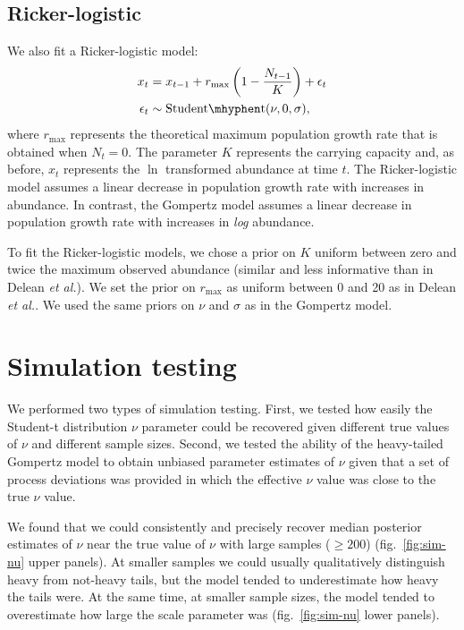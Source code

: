 \documentclass[12pt]{article}
\begin{document}
\subsection{Ricker-logistic} We also fit a Ricker-logistic model:
\begin{align}
x_t &= x_{t-1} + r_{\mathrm{max}}\left(1 - \frac{N_{t-1}}{K}\right) + \epsilon_t\\
\epsilon_t &\sim \mathrm{Student\mhyphen t}(\nu, 0, \sigma),
\end{align}
where \(r_\mathrm{max}\) represents the theoretical maximum population growth rate that is obtained when \(N_t = 0\). The parameter \(K\) represents the carrying capacity and, as before, \(x_t\) represents the \(\ln\) transformed abundance at time \(t\). The Ricker-logistic model assumes a linear decrease in population growth rate with increases in abundance. In contrast, the Gompertz model assumes a linear decrease in population growth rate with increases in \textit{log} abundance.

To fit the Ricker-logistic models, we chose a prior on \(K\) uniform between zero and twice the maximum observed abundance (similar and less informative than in Delean \emph{et al.}\cite{delean2013}). We set the prior on \(r_\mathrm{max}\) as uniform between 0 and 20 as in Delean \emph{et al.}\cite{delean2013}. We used the same priors on \(\nu\) and \(\sigma\) as in the Gompertz model.

\section{Simulation testing} We performed two types of simulation testing. First, we tested how easily the Student-t distribution \(\nu\) parameter could be recovered given different true values of \(\nu\) and different sample sizes. Second, we tested the ability of the heavy-tailed Gompertz model to obtain unbiased parameter estimates of \(\nu\) given that a set of process deviations was provided in which the effective \(\nu\) value was close to the true \(\nu\) value.

We found that we could consistently and precisely recover median posterior estimates of \(\nu\) near the true value of \(\nu\) with large samples (\(\ge 200\)) (fig.~\ref{fig:sim-nu} upper panels). At smaller samples we could usually qualitatively distinguish heavy from not-heavy tails, but the model tended to underestimate how heavy the tails were. At the same time, at smaller sample sizes, the model tended to overestimate how large the scale parameter was (fig.~\ref{fig:sim-nu} lower panels).
\end{document}
